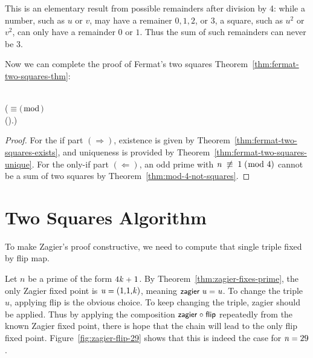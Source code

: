 \documentclass[sigplan,screen]{acmart}
\newcommand{\m}[1]{\todo[fancyline,color=blue!40,size=\scriptsize]{\textsf{JC: #1}}} %
\renewcommand{\HOLinline}[1]{\ensuremath{#1}} %
\renewcommand{\HOLConst}[1]{{\fontsize{9pt}{1em}\selectfont\textsf{\upshape #1}}}
\renewcommand{\HOLNumLit}[1]{{\selectfont\textrm{\upshape #1}}} %
\renewcommand{\HOLSymConst}[1]{{\fontsize{9pt}{1em}\selectfont\textsf{\upshape #1}}}
\begin{document}
\noindent
This is an elementary result from possible remainders after division by 4:
while a number, such as $u$ or $v$, may have a remainer $0, 1, 2$, or $3$,
a square, such as $u^{2}$ or $v^{2}$, can only have a remainder $0$ or $1$.
Thus the sum of such remainders can never be $3$.

Now we can complete the proof of Fermat's two squares Theorem~\ref{thm:fermat-two-squares-thm}:
\begin{HOLmath}
\HOLTokenTurnstile{}\HOLConst{prime}\;\;\HOLSymConst{\HOLTokenImp{}}\\
\;\;\;\;\;\;\;(\;\ensuremath{\equiv}\;\HOLNumLit{1}\;\ensuremath{(}\ensuremath{\bmod}\;\HOLNumLit{4}\ensuremath{)}\;\HOLSymConst{\HOLTokenEquiv{}}\\
\;\;\;\;\;\;\;\;\;\;\HOLSymConst{\HOLTokenUnique{}}(\HOLBoundVar{u}\HOLSymConst{,}).\;\HOLConst{\HOLConst{odd}}\;\;\HOLSymConst{\HOLTokenConj{}}\;\HOLConst{\HOLConst{even}}\;\;\HOLSymConst{\HOLTokenConj{}}\;\;\HOLSymConst{=}\;\HOLBoundVar{u}\HOLSymConst{\ensuremath{\sp{2}}}\;\HOLSymConst{\ensuremath{+}}\;\HOLBoundVar{v}\HOLSymConst{\ensuremath{\sp{2}}})
\end{HOLmath}
\begin{proof}
For the if part $(\Rightarrow)$,
existence is given by Theorem~\ref{thm:fermat-two-squares-exists}, and
uniqueness is provided by Theorem~\ref{thm:fermat-two-squares-unique}.
For the only-if part $(\Leftarrow)$,
an odd prime with \HOLinline{\HOLFreeVar{n}\;\ensuremath{\not\equiv}\;\HOLNumLit{1}\;\ensuremath{(}\ensuremath{\bmod}\;\HOLNumLit{4}\ensuremath{)}} cannot be a sum of two squares by Theorem~\ref{thm:mod-4-not-squares}.
\end{proof}


\section{Two Squares Algorithm}
\label{sec:algorithm}
To make Zagier's proof constructive, we need to compute that single triple fixed by flip map.

Let $n$ be a prime of the form \HOLinline{\HOLNumLit{4}\HOLSymConst{\ensuremath{}}\HOLFreeVar{k}\;\HOLSymConst{\ensuremath{+}}\;\HOLNumLit{1}}.
By Theorem~\ref{thm:zagier-fixes-prime}, the only Zagier fixed point is \HOLinline{\HOLFreeVar{u}\;\HOLSymConst{=}\;(\HOLNumLit{1}\HOLSymConst{,}\HOLNumLit{1}\HOLSymConst{,}\HOLFreeVar{k})}, meaning \HOLinline{\HOLConst{zagier}\;\HOLFreeVar{u}\;\HOLSymConst{=}\;\HOLFreeVar{u}}.
To change the triple $u$, applying \HOLConst{flip} is the obvious choice.
To keep changing the triple, \HOLConst{zagier} should be applied.
Thus by applying the composition \HOLinline{\HOLConst{zagier}\;\HOLSymConst{\HOLTokenCompose}\;\HOLConst{flip}} repeatedly from the known Zagier fixed point, there is hope that the chain will lead to the only flip fixed point.
Figure~\ref{fig:zagier-flip-29} shows that this is indeed the case for \HOLinline{\HOLFreeVar{n}\;\HOLSymConst{=}\;\HOLNumLit{29}}.
\end{document}
